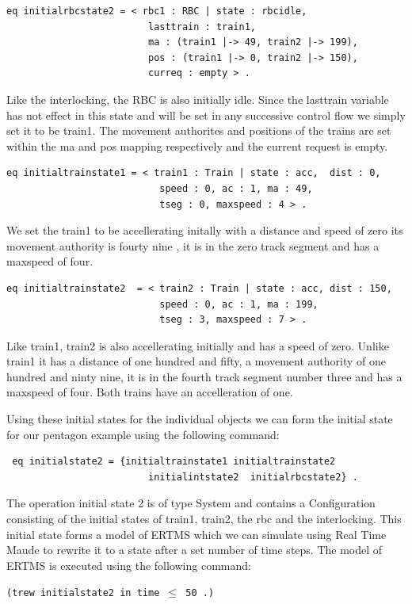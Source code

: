 \begin{lstlisting}[caption = The initial RBC state in Maude]
 eq initialrbcstate2 = < rbc1 : RBC | state : rbcidle, 
                         lasttrain : train1,  
                         ma : (train1 |-> 49, train2 |-> 199), 
                         pos : (train1 |-> 0, train2 |-> 150), 
                         curreq : empty > .
\end{lstlisting}

Like the interlocking, the RBC is also initially idle. Since the lasttrain variable has not effect in this state and will be set in any successive control flow we simply set it to be train1. The movement authorites  and positions of the trains are set within the ma and pos mapping respectively and the current request is empty.  

\begin{lstlisting}[caption = The intital state of train2 in Maude]
 eq initialtrainstate1 = < train1 : Train | state : acc,  dist : 0, 
                           speed : 0, ac : 1, ma : 49, 
                           tseg : 0, maxspeed : 4 > .
\end{lstlisting}
We set the train1 to be accellerating initally with a distance and speed of zero its movement authority is fourty nine , it is in the zero track segment and has a maxspeed of four. 

\begin{lstlisting}[caption = The intial state of train2 in Maude]
eq initialtrainstate2  = < train2 : Train | state : acc, dist : 150, 
                           speed : 0, ac : 1, ma : 199,
                           tseg : 3, maxspeed : 7 > .
\end{lstlisting}
Like train1, train2 is also accellerating initially and has a speed of zero.  Unlike train1 it has a distance of one hundred and fifty, a movement authority of one hundred and ninty nine, it is in the fourth track segment number three and has a maxspeed of four. Both trains have an accelleration of one. 

Using these initial states for the individual objects we can form the initial state for our pentagon example using the following command:
\begin{lstlisting}
 eq initialstate2 = {initialtrainstate1 initialtrainstate2 
                         initialintstate2  initialrbcstate2} . 
\end{lstlisting}
The operation initial state 2 is of type System and contains a Configuration consisting of the initial states of train1, train2, the rbc and the interlocking. This initial state forms a model of ERTMS which we can simulate using Real Time Maude to rewrite it to a state after a set number of time steps. The model of ERTMS is executed using the following command:
\begin{center}
\texttt{(trew initialstate2 in time $\leq$ 50 .)}
\end{center}

